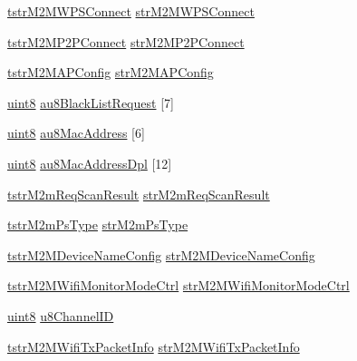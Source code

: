 \begin{DoxyCompactItemize}
\item 
\hyperlink{structtstrM2MWPSConnect}{tstr\+M2\+M\+W\+P\+S\+Connect} \hyperlink{group__WifiSetCustInfoElementFn_gab96b5d47666de98ab9d1a853e51f8187}{str\+M2\+M\+W\+P\+S\+Connect}
\item 
\hyperlink{structtstrM2MP2PConnect}{tstr\+M2\+M\+P2\+P\+Connect} \hyperlink{group__WifiSetCustInfoElementFn_gab580a9212d8a2f15fbe45ec23645a7f8}{str\+M2\+M\+P2\+P\+Connect}
\item 
\hyperlink{structtstrM2MAPConfig}{tstr\+M2\+M\+A\+P\+Config} \hyperlink{group__WifiSetCustInfoElementFn_ga33900b8a4558ea4ad0db0fa2d11482c3}{str\+M2\+M\+A\+P\+Config}
\item 
\hyperlink{group__DataT_ga4df709a77647e870bbf1d955b8edc9a6}{uint8} \hyperlink{group__WifiSetCustInfoElementFn_ga6f70ecd991f703463e35811a52a44b8d}{au8\+Black\+List\+Request} \mbox{[}7\mbox{]}
\item 
\hyperlink{group__DataT_ga4df709a77647e870bbf1d955b8edc9a6}{uint8} \hyperlink{group__WifiSetCustInfoElementFn_ga7c52de645efc2da332e16b2bae901a3f}{au8\+Mac\+Address} \mbox{[}6\mbox{]}
\item 
\hyperlink{group__DataT_ga4df709a77647e870bbf1d955b8edc9a6}{uint8} \hyperlink{group__WifiSetCustInfoElementFn_ga1c8c88a24f0435e3d207b68cc9ed4a90}{au8\+Mac\+Address\+Dpl} \mbox{[}12\mbox{]}
\item 
\hyperlink{structtstrM2mReqScanResult}{tstr\+M2m\+Req\+Scan\+Result} \hyperlink{group__WifiSetCustInfoElementFn_ga7c762ccb0b8c6e59683112c64d5162a0}{str\+M2m\+Req\+Scan\+Result}
\item 
\hyperlink{structtstrM2mPsType}{tstr\+M2m\+Ps\+Type} \hyperlink{group__WifiSetCustInfoElementFn_ga7f6c06c6585ff28e2e0cfc9d19eab533}{str\+M2m\+Ps\+Type}
\item 
\hyperlink{structtstrM2MDeviceNameConfig}{tstr\+M2\+M\+Device\+Name\+Config} \hyperlink{group__WifiSetCustInfoElementFn_ga9608ef3bf6a4e7bf67c95d25a1540ec5}{str\+M2\+M\+Device\+Name\+Config}
\item 
\hyperlink{structtstrM2MWifiMonitorModeCtrl}{tstr\+M2\+M\+Wifi\+Monitor\+Mode\+Ctrl} \hyperlink{group__WifiSetCustInfoElementFn_ga68ebf8eb543fabfdf0021e6ba8fcb568}{str\+M2\+M\+Wifi\+Monitor\+Mode\+Ctrl}
\item 
\hyperlink{group__DataT_ga4df709a77647e870bbf1d955b8edc9a6}{uint8} \hyperlink{group__WifiSetCustInfoElementFn_gacafdeb10d6414675b5e85687a9392ebc}{u8\+Channel\+ID}
\item 
\hyperlink{structtstrM2MWifiTxPacketInfo}{tstr\+M2\+M\+Wifi\+Tx\+Packet\+Info} \hyperlink{group__WifiSetCustInfoElementFn_gaa1754f14e37a56c5ae27a82273523c0f}{str\+M2\+M\+Wifi\+Tx\+Packet\+Info}

\end{DoxyCompactItemize}
